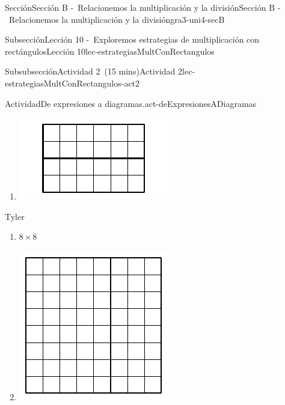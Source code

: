\documentclass[oneside,10pt,]{article}
\begin{document}
\begin{sectionptx}{Sección}{Sección B -~Relacionemos la multiplicación y la división}{}{Sección B -~Relacionemos la multiplicación y la división}{}{}{gra3-uni4-secB}
\begin{subsectionptx}{Subsección}{Lección 10 -~Exploremos estrategias de multiplicación con rectángulos}{}{Lección 10}{}{}{lec-estrategiasMultConRectangulos}
\begin{subsubsectionptx}{Subsubsección}{Actividad 2~(15 mins)}{}{Actividad 2}{}{}{lec-estrategiasMultConRectangulos-act2}
\begin{activity}{Actividad}{De expresiones a diagramas.}{act-deExpresionesADiagramas}
\begin{sidebyside}{3}{0.0166666666666667}{0.0166666666666667}{0.0333333333333333}
\begin{sbspanel}{0.3}
\begin{enumerate}
\item{}\includegraphics[width=\linewidth]{external/svg-source/tikz-file-153055.pdf}
%
\end{enumerate}
\end{sbspanel}%
\begin{sbspanel}{0.3}%
Tyler%
%
\begin{enumerate}
\item{}\(\displaystyle 8\times 8\)%
\item{}\includegraphics[width=\linewidth]{external/svg-source/tikz-file-153056.pdf}
%
\end{enumerate}
\end{sbspanel}%

\end{sidebyside}
\end{activity}
\end{subsubsectionptx}
\end{subsectionptx}
\end{sectionptx}
\end{document}
